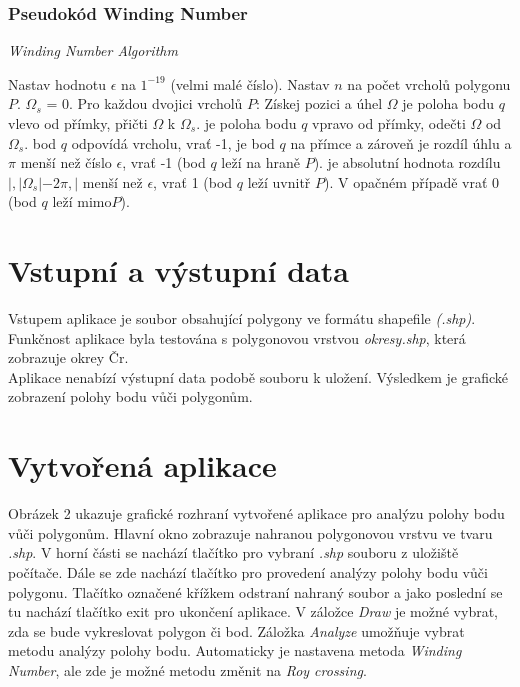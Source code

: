 \documentclass[a4paper,12pt]{article}
\begin{document}
    \subsubsection{Pseudokód Winding Number}
    \begin{algorithm}
    \caption {\textit{Winding Number Algorithm}}
    \begin{algorithmic}[1]
        \State Nastav hodnotu $\epsilon$ na $1^{-19}$ (velmi malé číslo).
        \State Nastav $n$ na počet vrcholů polygonu $P$.
        \State $\varOmega_s$ = 0.
        \State Pro každou dvojici vrcholů $P$:
        \State \indent Získej pozici a úhel $\varOmega$
        \State {} je poloha bodu $q$ vlevo od přímky, přičti $\varOmega$ k $\varOmega_s$.
        \State {} je poloha bodu $q$ vpravo od přímky, odečti $\varOmega$ od $\varOmega_s$.
        \State {} bod $q$ odpovídá vrcholu, vrať -1,
        \State {} je bod $q$ na přímce a zároveň je rozdíl úhlu a $\pi$ menší než číslo $\epsilon$, vrať -1 (bod \State \indent$q$ leží na hraně $P$).
         je absolutní hodnota rozdílu $|,|\varOmega_s| - 2\pi,|$ menší než $\epsilon$, vrať 1 (bod $q$ leží uvnitř $P$).
        \State V opačném případě vrať 0 (bod $q$ leží mimo$P$).
    \end{algorithmic}
    \end{algorithm}

    \newpage
    \section{Vstupní a výstupní data}
     Vstupem aplikace je soubor obsahující polygony ve formátu shapefile \emph{(.shp)}. Funkčnost aplikace byla testována s polygonovou vrstvou \emph{okresy.shp}, která zobrazuje okrey Čr.\\
     
     Aplikace nenabízí výstupní data podobě souboru k uložení. Výsledkem je grafické zobrazení polohy bodu vůči polygonům.
    \newpage
    \section{Vytvořená aplikace}
    Obrázek 2 ukazuje grafické rozhraní vytvořené aplikace pro analýzu polohy bodu vůči polygonům. Hlavní okno zobrazuje nahranou polygonovou vrstvu ve tvaru \emph{.shp}. V horní části se nachází tlačítko pro vybraní \emph{.shp} souboru z uložiště počítače. Dále se zde nachází tlačítko pro provedení analýzy polohy bodu vůči polygonu. Tlačítko označené křížkem odstraní nahraný soubor a jako poslední se tu nachází tlačítko exit pro ukončení aplikace. V záložce \emph{Draw} je možné vybrat, zda se bude vykreslovat polygon či bod. Záložka \emph{Analyze} umožňuje vybrat metodu analýzy polohy bodu. Automaticky je nastavena metoda  \emph{Winding Number}, ale zde je možné metodu změnit na \emph{Roy crossing}.\\
\end{document}

